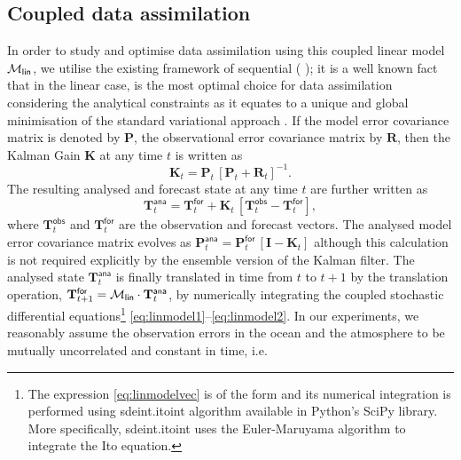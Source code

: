 \documentclass[a4paper,10pt]{article}
\begin{document}
\begin{multicols}{2}
\subsection{Coupled data assimilation}
\label{sec:DAlinear}
In order to study and optimise data assimilation using this coupled linear model $\mathcal{M}_\mathsf{lin}$, we utilise the existing framework of sequential  ( {\enkf}); it is a well known fact that in the linear case, {\enkf} is the most optimal choice for data assimilation considering the analytical constraints as it equates to a unique and global minimisation of the standard variational approach \citep{carrassi2018}. If the model error covariance matrix is denoted by $\mathbf{P}$, the observational error covariance matrix by $\mathbf{R}$, then the Kalman Gain $\mathbf{K}$ at any time $t$ is written as
\begin{equation}
\mathbf{K}_t = \mathbf{P}_t\,[\mathbf{P}_t + \mathbf{R}_t]^{-1}.
\label{eq:kgain1}
\end{equation}
The resulting analysed and forecast state at any time $t$ are further written as
\begin{equation}
\mathbf{T}_t^\mathsf{ana} = \mathbf{T}_t^\mathsf{for} + \mathbf{K}_t\,[\mathbf{T}_t^\mathsf{obs} - \mathbf{T}_t^\mathsf{for}],
\label{eq:ana}
\end{equation}
where $\mathbf{T}_t^\mathsf{obs}$ and $\mathbf{T}_t^\mathsf{for}$ are the observation and forecast vectors. The analysed model error covariance matrix evolves as $\mathbf{P}_t^\mathsf{ana} = \mathbf{P}_t^\mathsf{for}\,[\mathbf{I} - \mathbf{K}_t]$ although this calculation is not required explicitly by the ensemble version of the Kalman filter. The analysed state $\mathbf{T}_t^\mathsf{ana}$ is finally translated in time from $t$ to $t + 1$ by the translation operation, $\mathbf{T}_{t+1}^\mathsf{for} = \mathcal{M}_\mathsf{lin} \cdot \mathbf{T}_{t}^\mathsf{ana}$, by numerically integrating the coupled stochastic differential equations\footnote{The expression \eqref{eq:linmodelvec} is of the  form and its numerical integration is performed using \textsf{sdeint}.\textsf{itoint} algorithm available in Python's \textsf{SciPy} library. More specifically, \textsf{sdeint}.\textsf{itoint} uses the Euler-Maruyama algorithm to integrate the Ito equation.}  \eqref{eq:linmodel1}--\eqref{eq:linmodel2}. In our experiments, we reasonably assume the observation errors in the ocean and the atmosphere to be mutually uncorrelated and constant in time, i.e.
\begin{equation}

\end{equation}
\end{multicols}
\end{document}
